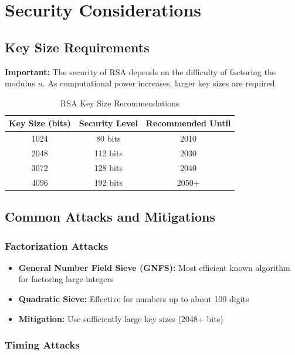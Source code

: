 \documentclass[11pt,a4paper]{article}
\begin{document}
\section{Security Considerations}

\subsection{Key Size Requirements}

\begin{warningbox}
\textbf{Important:} The security of RSA depends on the difficulty of factoring the modulus $n$. As computational power increases, larger key sizes are required.
\end{warningbox}

\begin{table}[h]
\centering
\begin{tabular}{|c|c|c|}
\hline
\textbf{Key Size (bits)} & \textbf{Security Level} & \textbf{Recommended Until} \\
\hline
1024 & 80 bits & 2010 \\
2048 & 112 bits & 2030 \\
3072 & 128 bits & 2040 \\
4096 & 192 bits & 2050+ \\
\hline
\end{tabular}
\caption{RSA Key Size Recommendations}
\end{table}

\subsection{Common Attacks and Mitigations}

\subsubsection{Factorization Attacks}

\begin{itemize}
    \item \textbf{General Number Field Sieve (GNFS):} Most efficient known algorithm for factoring large integers
    \item \textbf{Quadratic Sieve:} Effective for numbers up to about 100 digits
    \item \textbf{Mitigation:} Use sufficiently large key sizes (2048+ bits)
\end{itemize}

\subsubsection{Timing Attacks}
\end{document}
